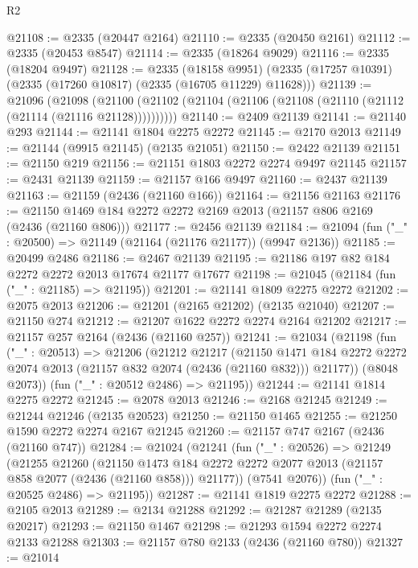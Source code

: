 \begin{lexlean}{R2}
\begin{coremodule}
@21108 := @2335 (@20447 @2164)
@21110 := @2335 (@20450 @2161)
@21112 := @2335 (@20453 @8547)
@21114 := @2335 (@18264 @9029)
@21116 := @2335 (@18204 @9497)
@21128 := @2335
    (@18158 @9951)
    (@2335 (@17257 @10391) (@2335 (@17260 @10817) (@2335 (@16705 @11229) @11628)))
@21139 := @21096
    (@21098 (@21100 (@21102 (@21104 (@21106 (@21108 (@21110 (@21112 (@21114 (@21116 @21128))))))))))
@21140 := @2409 @21139
@21141 := @21140 @293
@21144 := @21141 @1804 @2275 @2272
@21145 := @2170 @2013
@21149 := @21144 (@9915 @21145) (@2135 @21051)
@21150 := @2422 @21139
@21151 := @21150 @219
@21156 := @21151 @1803 @2272 @2274 @9497 @21145
@21157 := @2431 @21139
@21159 := @21157 @166 @9497
@21160 := @2437 @21139
@21163 := @21159 (@2436 (@21160 @166))
@21164 := @21156 @21163
@21176 := @21150 @1469 @184 @2272 @2272 @2169 @2013 (@21157 @806 @2169 (@2436 (@21160 @806)))
@21177 := @2456 @21139
@21184 := @21094 (fun ("_" : @20500) => @21149 (@21164 (@21176 @21177)) (@9947 @2136))
@21185 := @20499 @2486
@21186 := @2467 @21139
@21195 := @21186 @197 @82 @184 @2272 @2272 @2013 @17674 @21177 @17677
@21198 := @21045 (@21184 (fun ("_" : @21185) => @21195))
@21201 := @21141 @1809 @2275 @2272
@21202 := @2075 @2013
@21206 := @21201 (@2165 @21202) (@2135 @21040)
@21207 := @21150 @274
@21212 := @21207 @1622 @2272 @2274 @2164 @21202
@21217 := @21157 @257 @2164 (@2436 (@21160 @257))
@21241 := @21034
    (@21198
      (fun ("_" : @20513) =>
      @21206
        (@21212
          @21217
          (@21150
            @1471
            @184
            @2272
            @2272
            @2074
            @2013
            (@21157 @832 @2074 (@2436 (@21160 @832)))
            @21177))
        (@8048 @2073))
      (fun ("_" : @20512 @2486) => @21195))
@21244 := @21141 @1814 @2275 @2272
@21245 := @2078 @2013
@21246 := @2168 @21245
@21249 := @21244 @21246 (@2135 @20523)
@21250 := @21150 @1465
@21255 := @21250 @1590 @2272 @2274 @2167 @21245
@21260 := @21157 @747 @2167 (@2436 (@21160 @747))
@21284 := @21024
    (@21241
      (fun ("_" : @20526) =>
      @21249
        (@21255
          @21260
          (@21150
            @1473
            @184
            @2272
            @2272
            @2077
            @2013
            (@21157 @858 @2077 (@2436 (@21160 @858)))
            @21177))
        (@7541 @2076))
      (fun ("_" : @20525 @2486) => @21195))
@21287 := @21141 @1819 @2275 @2272
@21288 := @2105 @2013
@21289 := @2134 @21288
@21292 := @21287 @21289 (@2135 @20217)
@21293 := @21150 @1467
@21298 := @21293 @1594 @2272 @2274 @2133 @21288
@21303 := @21157 @780 @2133 (@2436 (@21160 @780))
@21327 := @21014

\end{coremodule}
\end{lexlean}
